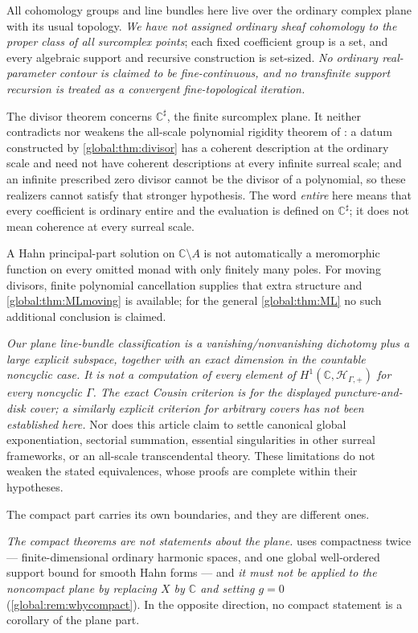 \documentclass[11pt,letterpaper]{article}
\theoremstyle{definition}
\theoremstyle{remark}
\newcommand{\C}{\mathbb C}
\newcommand{\HP}{\mathscr H_{\Gamma,+}}
\newcommand{\sh}{^{\sharp}}
\numberwithin{equation}{section}
\begin{document}
All cohomology groups and line bundles here live over the ordinary complex plane with its usual topology. \emph{We have not assigned ordinary sheaf cohomology to the proper class of all surcomplex points}; each fixed coefficient group is a set, and every algebraic support and recursive construction is set-sized. \emph{No ordinary real-parameter contour is claimed to be fine-continuous, and no transfinite support recursion is treated as a convergent fine-topological iteration.}

The divisor theorem concerns $\C\sh$, the finite surcomplex plane. It neither contradicts nor weakens the all-scale polynomial rigidity theorem of \cite[\S12]{Source}: a datum constructed by \cref{global:thm:divisor} has a coherent description at the ordinary scale and need not have coherent descriptions at every infinite surreal scale; and an infinite prescribed zero divisor cannot be the divisor of a polynomial, so these realizers cannot satisfy that stronger hypothesis. The word \emph{entire} here means that every coefficient is ordinary entire and the evaluation is defined on $\C\sh$; it does not mean coherence at every surreal scale.

A Hahn principal-part solution on $\C\setminus A$ is not automatically a meromorphic function on every omitted monad with only finitely many poles. For moving divisors, finite polynomial cancellation supplies that extra structure and \cref{global:thm:MLmoving} is available; for the general \cref{global:thm:ML} no such additional conclusion is claimed.

\emph{Our plane line-bundle classification is a vanishing/nonvanishing dichotomy plus a large explicit subspace, together with an exact dimension in the countable noncyclic case. It is not a computation of every element of $H^1(\C,\HP)$ for every noncyclic $\Gamma$. The exact Cousin criterion is for the displayed puncture-and-disk cover; a similarly explicit criterion for arbitrary covers has not been established here.} Nor does this article claim to settle canonical global exponentiation, sectorial summation, essential singularities in other surreal frameworks, or an all-scale transcendental theory. These limitations do not weaken the stated equivalences, whose proofs are complete within their hypotheses.

The compact part carries its own boundaries, and they are different ones.

\emph{The compact theorems are not statements about the plane.}  uses compactness twice --- finite-dimensional ordinary harmonic spaces, and one global well-ordered support bound for smooth Hahn forms --- and \emph{it must not be applied to the noncompact plane by replacing $X$ by $\C$ and setting $g=0$} (\cref{global:rem:whycompact}). In the opposite direction, no compact statement is a corollary of the plane part.
\end{document}
